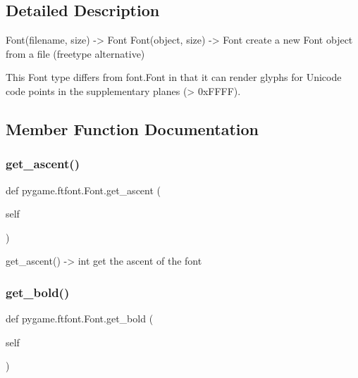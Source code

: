 \subsection{Detailed Description}
\begin{DoxyVerb}Font(filename, size) -> Font
   Font(object, size) -> Font
   create a new Font object from a file (freetype alternative)

   This Font type differs from font.Font in that it can render glyphs
   for Unicode code points in the supplementary planes (> 0xFFFF).\end{DoxyVerb}
 

\subsection{Member Function Documentation}
\mbox{\label{classpygame_1_1ftfont_1_1_font_a0a7db106ed98b2852ee257c33d5b1566}} 
\subsubsection{\texorpdfstring{get\+\_\+ascent()}{get\_ascent()}}
{\footnotesize\ttfamily def pygame.\+ftfont.\+Font.\+get\+\_\+ascent (\begin{DoxyParamCaption}\item[{}]{self }\end{DoxyParamCaption})}

\begin{DoxyVerb}get_ascent() -> int
   get the ascent of the font\end{DoxyVerb}
 \mbox{\label{classpygame_1_1ftfont_1_1_font_a5fb693d3ccb1d4622cf045f045077592}} 
\subsubsection{\texorpdfstring{get\+\_\+bold()}{get\_bold()}}
{\footnotesize\ttfamily def pygame.\+ftfont.\+Font.\+get\+\_\+bold (\begin{DoxyParamCaption}\item[{}]{self }\end{DoxyParamCaption})}

